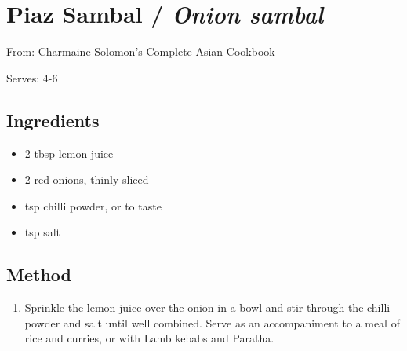 \section{Piaz Sambal / \emph{Onion sambal}}


From: Charmaine Solomon's Complete Asian Cookbook

Serves: 4-6

\subsection{Ingredients}

\begin{itemize}
	\item 2 tbsp lemon juice 
	\item 2 red onions, thinly sliced 
	\item {} tsp chilli powder, or to taste 
	\item {} tsp salt 
\end{itemize}

\subsection{Method}

\begin{enumerate}
	\item Sprinkle the lemon juice over the onion in a bowl and stir through the chilli powder and salt until well combined. Serve as an accompaniment to a meal of rice and curries, or with Lamb kebabs and Paratha.
\end{enumerate}
